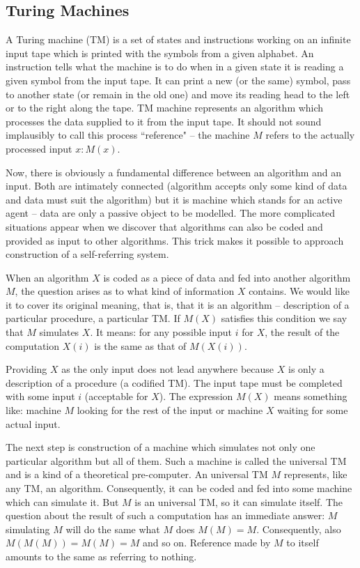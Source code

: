 \subsection{Turing Machines}\label{su:tm}
A Turing machine (TM) is a set of states and instructions working on an infinite input tape 
which is printed with the symbols from a given alphabet. An instruction tells what the machine is to do when in a 
given state it is reading a given symbol from the input tape. It can print a new (or the same) symbol, pass to 
another state (or remain in the old one) and move its reading head to the left or to the right along the tape. TM 
machine represents an algorithm which processes the data supplied to it from the input tape. It should not sound 
implausibly to call this process ``reference" -- the machine $M$ refers to the actually processed input $x : M(x)$.

Now, there is obviously a fundamental difference between an algorithm and an input. Both are intimately 
connected (algorithm accepts only some kind of data and data must suit the algorithm) but it is machine which 
stands for an active agent -- data are only a passive object to be modelled. The more complicated situations appear 
when we discover that algorithms can also be coded and provided as input to other algorithms. This trick makes it 
possible to approach construction of a self-referring system. 

When an algorithm $X$ is coded as a piece of data and fed into another algorithm $M$, the question arises as to what 
kind of information $X$ contains. We would like it to cover its original meaning, that is, that it is an algorithm -- 
description of a particular procedure, a particular TM. If $M(X)$ satisfies this condition we say that $M$ simulates $X$. 
It means: for any possible input $i$ for $X$, the result of the computation $X(i)$ is the same as that of $M(X(i))$. 

Providing $X$ as the only input does not lead anywhere because $X$ is only a description of a procedure (a codified 
TM). The input tape must be completed with  some input $i$ (acceptable for $X$). The expression $M(X)$ means 
something like: machine $M$ looking for the rest of the input or machine $X$ waiting for some actual input.

The next step is construction of a machine which simulates not only one particular algorithm but all of them. 
Such a machine is called the universal TM and is a kind of a theoretical pre-computer. An universal TM $M$ 
represents, like any TM, an algorithm. Consequently, it can be coded and fed into some machine which can 
simulate it. But $M$ is an universal TM, so it can simulate itself. The question about the result of such a
computation has an immediate answer: $M$ simulating $M$ will do the same what $M$ does $M(M)=M.$ Consequently, 
also $M(M(M))=M(M)=M$ and so on. Reference made by $M$ to itself amounts to the same as referring to nothing.

